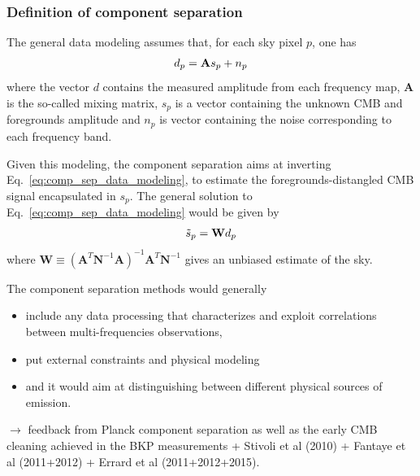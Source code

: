 \subsubsection{Definition of component separation}
The general data modeling assumes that, for each sky pixel $p$, one has
\begin{eqnarray}
	\centering	
		d_p = \mathbf{A}s_p + n_p
	\label{eq:comp_sep_data_modeling}
\end{eqnarray}
where the vector $d$ contains the measured amplitude from each frequency map, $\mathbf{A}$ is the so-called mixing matrix, $s_p$ is a vector containing the unknown CMB and foregrounds amplitude and $n_p$ is vector containing the noise corresponding to each frequency band.

Given this modeling, the component separation aims at inverting Eq.~\ref{eq:comp_sep_data_modeling}, to estimate the foregrounds-distangled CMB signal encapsulated in $s_p$. 
The general solution to Eq.~\ref{eq:comp_sep_data_modeling} would be given by
\begin{eqnarray}
	\centering
		\tilde{s}_p = \mathbf{W}d_p
	\label{eq:sp_solution}
\end{eqnarray}
where $\mathbf{W}\equiv  \left( \mathbf{A}^T\mathbf{N}^{-1}\mathbf{A} \right)^{-1}\mathbf{A}^T\mathbf{N}^{-1}$ gives an unbiased estimate of the sky.

The component separation methods would generally
\begin{itemize}
	\item include any data processing that characterizes and exploit correlations between multi-frequencies observations,
	\item put external constraints and physical modeling
	\item and it would aim at distinguishing between different physical sources of emission.
\end{itemize}

$\rightarrow$ feedback from Planck component separation as well as the early CMB cleaning achieved in the BKP measurements + Stivoli et al (2010) + Fantaye et al (2011+2012) + Errard et al (2011+2012+2015).


